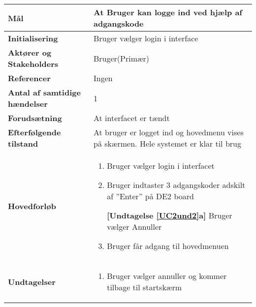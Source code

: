 \begin{table}[H] \centering
\begin{tabular}{|p{6cm}|p{8cm}|}
	\hline
\textbf{Mål}								
&At Bruger kan logge ind ved hjælp af adgangskode
 \\\hline
\textbf{Initialisering}					
&Bruger vælger login i interface
 \\\hline
\textbf{Aktører og Stakeholders}			
&Bruger(Primær)
 \\\hline
\textbf{Referencer}						
&Ingen
 \\\hline
\textbf{Antal af samtidige hændelser}	
&1
 \\\hline
\textbf{Forudsætning}					
&At interfacet er tændt
 \\\hline
\textbf{Efterfølgende tilstand}			
&At bruger er logget ind og hovedmenu vises på skærmen. Hele systemet er klar til brug
 \\\hline
\textbf{Hovedforløb}						
& 
\begin{enumerate}

\item Bruger vælger login i interfacet

\item \label{UC2und1}Bruger indtaster 3 adgangskoder adskilt af ''Enter'' på DE2 board \newline

\textbf{[Undtagelse \ref{UC2und2}a]} Bruger vælger Annuller

\item Bruger får adgang til hovedmenuen	
 
\end{enumerate}
\\\hline

\textbf{Undtagelser}						
&\begin{enumerate}[label= \ref{UC2und1}a.]
			\item Bruger vælger annuller og kommer tilbage til startskærm
		\end{enumerate}
\\\hline


	\end{tabular}
	\label{UC1} 
\end{table}